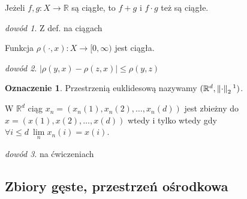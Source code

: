 \documentclass[twoside,10pt]{article}
\newcommand{\norm}[1]{\left\lVert#1\right\rVert}
\theoremstyle{definition}
\theoremstyle{definition}
\theoremstyle{definition}
\theoremstyle{definition}
\theoremstyle{remark}
\newtheorem*{dd}{dowód}
\theoremstyle{definition}
\theoremstyle{definition}
\theoremstyle{definition}
\newtheorem*{ozn}{Oznaczenie}
\theoremstyle{definition}
\theoremstyle{definition}
\theoremstyle{definition}
\begin{document}
\begin{tw} Jeżeli $f,g: X \rightarrow \mathbb{R}$ są ciągłe, to $f+g$ i $f \cdot g$ też są ciągłe. \end{tw} 
\begin{dd} Z def. na ciągach \end{dd} 
\begin{tw} Funkcja $\rho(\cdot,x): X \rightarrow [0,\infty)$ jest ciągła. \end{tw} 
\begin{dd} $| \rho(y,x) - \rho(z,x)| \le \rho(y,z)$ \end{dd} 
\begin{ozn} Przestrzenią euklidesową nazywamy $(\mathbb{R}^d,\norm{\cdot}_2\footnotemark)$. \end{ozn}
\footnotetext{$ \norm{x}_2 = \sqrt{\sum\limits_{i=1}^d |x(i)|^2} $}
\begin{tw} W $\mathbb{R}^d$ ciąg $x_n = (x_n(1),x_n(2),\ldots,x_n(d))$ jest zbieżny do $x = (x(1),x(2),\ldots,x(d))$ wtedy i tylko wtedy gdy $\forall i \le d \ \lim\limits_n x_n(i) = x(i)$. \end{tw}
\begin{dd} na ćwiczeniach \end{dd}

\subsection{Zbiory gęste, przestrzeń ośrodkowa}
\end{document}
